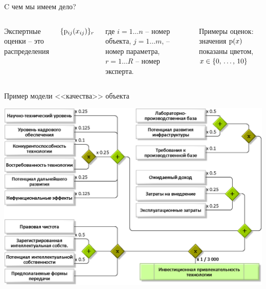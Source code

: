 \begin{frame}{C чем мы имеем дело?}
	\vspace*{3mm}
	\begin{columns}
		Экспертные оценки -- это распределения 
		{\large \begin{center} \hspace{-20mm}  $\{ {\mathrm{p}}_{ij}(x_{ij}) \}_r$ \end{center} }
		{\footnotesize где $i = 1 \ldots n$ -- номер объекта, $j = 1 \ldots m$, -- номер параметра, $r = 1 \ldots R$ -- номер эксперта}.  
		\begin{center}
			\vspace*{-8mm}
			  {\scriptsize {Примеры оценок: значения ${\mathrm{p}}(x)$ показаны цветом, $x \in \{0,\, \ldots,\, 10\}$}}
			  \\ \vspace*{2mm}
		\end{center}
	\end{columns}
 \end{frame} %

\begin{frame}{Пример модели <<качества>> объекта}
	\begin{center}
		\includegraphics[width=0.9\linewidth]{./pic/schemeF2}
	\end{center}
\end{frame} %

